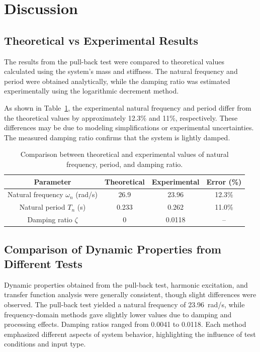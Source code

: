 \documentclass{article}  %
\begin{document}
\newpage
\section{Discussion}
\subsection{Theoretical vs Experimental Results}

The results from the pull-back test were compared to theoretical values calculated using the system's mass and stiffness. The natural frequency and period were obtained analytically, while the damping ratio was estimated experimentally using the logarithmic decrement method.

As shown in Table~\ref{tab:results}, the experimental natural frequency and period differ from the theoretical values by approximately 12.3\% and 11\%, respectively. These differences may be due to modeling simplifications or experimental uncertainties. The measured damping ratio confirms that the system is lightly damped.

\begin{table}[h]
\centering
\begin{tabular}{|c|c|c|c|}
\hline
\textbf{Parameter} & \textbf{Theoretical} & \textbf{Experimental} & \textbf{Error (\%)} \\ \hline
Natural frequency $\omega_n$ (rad/s) & 26.9 & 23.96 & 12.3\% \\ \hline
Natural period $T_n$ (s) & 0.233 & 0.262 & 11.0\% \\ \hline
Damping ratio $\zeta$ & 0 & 0.0118 & -- \\ \hline
\end{tabular}
\caption{Comparison between theoretical and experimental values of natural frequency, period, and damping ratio.}
\label{tab:results}
\end{table}

\subsection{Comparison of Dynamic Properties from Different Tests}

Dynamic properties obtained from the pull-back test, harmonic excitation, and transfer function analysis were generally consistent, though slight differences were observed. The pull-back test yielded a natural frequency of 23.96~rad/s, while frequency-domain methods gave slightly lower values due to damping and processing effects. Damping ratios ranged from 0.0041 to 0.0118. Each method emphasized different aspects of system behavior, highlighting the influence of test conditions and input type.
\end{document}
